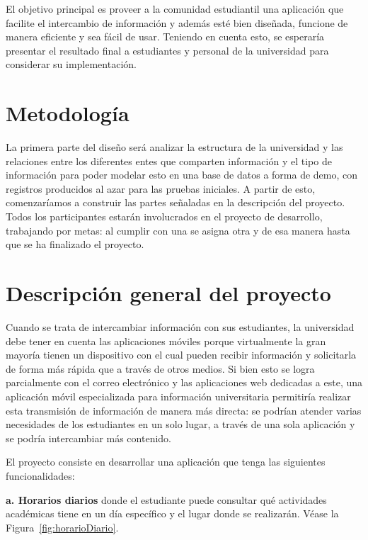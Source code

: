 \documentclass[12pt]{article}
\begin{document}
El objetivo principal es proveer a la comunidad estudiantil una aplicación que facilite el intercambio de información y además esté bien diseñada, funcione de manera eficiente y sea fácil de usar. Teniendo en cuenta esto, se esperaría presentar el resultado final a estudiantes y personal de la universidad para considerar su implementación.

\section{Metodología}


La primera parte del diseño será analizar la estructura de la universidad y las relaciones entre los diferentes entes que comparten información y el tipo de información para poder modelar esto en una base de datos a forma de demo, con registros producidos al azar para las pruebas iniciales. A partir de esto, comenzaríamos a construir las partes señaladas en la descripción del proyecto. Todos los participantes estarán involucrados en el proyecto de desarrollo, trabajando por metas: al cumplir con una se asigna otra y de esa manera hasta que se ha finalizado el proyecto.


\section{Descripción general del proyecto}

Cuando se trata de intercambiar información con sus estudiantes, la universidad debe tener en cuenta las aplicaciones móviles porque virtualmente la gran mayor\'ia tienen un dispositivo con el cual pueden recibir información y solicitarla de forma más rápida que a través de otros medios. Si bien esto se logra parcialmente con el correo electrónico y las aplicaciones web dedicadas a este, una aplicación m\'ovil especializada para información universitaria permitiría realizar esta transmisi\'on de informaci\'on de manera más directa: se podrían atender varias necesidades de los estudiantes en un solo lugar, a través de una sola aplicación y se podría intercambiar más contenido.

\newpage

El proyecto consiste en desarrollar una aplicación que tenga las siguientes funcionalidades:

\textbf{a. Horarios diarios} donde el estudiante puede consultar qué actividades académicas tiene en un día específico y el lugar donde se realizarán. Véase la Figura~\ref{fig:horarioDiario}.\\
\end{document}
